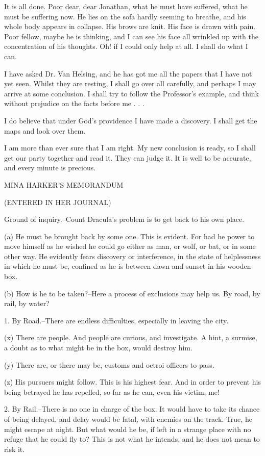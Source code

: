 It is all done. Poor dear, dear Jonathan, what he must have suffered, what he must be suffering now. He lies on the sofa hardly seeming to breathe, and his whole body appears in collapse. His brows are knit. His face is drawn with pain. Poor fellow, maybe he is thinking, and I can see his face all wrinkled up with the concentration of his thoughts. Oh! if I could only help at all. I shall do what I can. 

I have asked Dr. Van Helsing, and he has got me all the papers that I have not yet seen. Whilst they are resting, I shall go over all carefully, and perhaps I may arrive at some conclusion. I shall try to follow the Professor's example, and think without prejudice on the facts before me . . . 

I do believe that under God's providence I have made a discovery. I shall get the maps and look over them. 

I am more than ever sure that I am right. My new conclusion is ready, so I shall get our party together and read it. They can judge it. It is well to be accurate, and every minute is precious. 

MINA HARKER'S MEMORANDUM 

(ENTERED IN HER JOURNAL) 

Ground of inquiry.--Count Dracula's problem is to get back to his own place. 

(a) He must be brought back by some one. This is evident. For had he power to move himself as he wished he could go either as man, or wolf, or bat, or in some other way. He evidently fears discovery or interference, in the state of helplessness in which he must be, confined as he is between dawn and sunset in his wooden box. 

(b) How is he to be taken?--Here a process of exclusions may help us. By road, by rail, by water? 

1. By Road.--There are endless difficulties, especially in leaving the city. 

(x) There are people. And people are curious, and investigate. A hint, a surmise, a doubt as to what might be in the box, would destroy him. 

(y) There are, or there may be, customs and octroi officers to pass. 

(z) His pursuers might follow. This is his highest fear. And in order to prevent his being betrayed he has repelled, so far as he can, even his victim, me! 

2. By Rail.--There is no one in charge of the box. It would have to take its chance of being delayed, and delay would be fatal, with enemies on the track. True, he might escape at night. But what would he be, if left in a strange place with no refuge that he could fly to? This is not what he intends, and he does not mean to risk it. 

